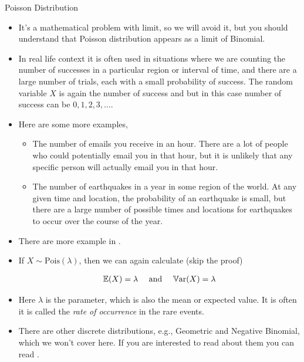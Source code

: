 \documentclass[8pt, usepdftitle=false]{beamer}
\begin{document}
\begin{frame}[allowframebreaks]{Poisson Distribution}
\begin{itemize}
\item It's a mathematical problem with limit, so we will avoid it, but you should understand that Poisson distribution appears as a limit of Binomial.

\framebreak

\item In real life context it  is often used in situations where we are counting the number of successes in a particular region or interval of time, and there are a large number of trials, each with a small probability of success. The random variable $X$ is again the number of success and but in this case number of success can be $0, 1, 2, 3, \ldots $.

\item Here are some more examples, 

\begin{itemize}
	\item The number of emails you receive in an hour. There are a lot of people who could potentially email you in that hour, but it is unlikely that any specific person will actually email you in that hour.

	\item The number of earthquakes in a year in some region of the world. At any given time and location, the probability of an earthquake is small, but there are a large number of possible times and locations for earthquakes to occur over the course of the year. 

\end{itemize}


\item There are more example in \cite{anderson_statistics_2020}.

\item If $X \sim \mathrm{Pois}(\lambda)$, then we can again calculate (skip the proof)

\begin{align*}
\mathbb{E}(X) = \lambda \quad \text{ and } \quad \mathbb{V}\mathrm{ar}{(}X) = \lambda
\end{align*}



\item Here $\lambda$ is the parameter, which is also the mean or expected value. It is often it is called the \emph{rate of occurrence} in the rare events.


\framebreak

\item There are other discrete distributions, e.g., Geometric and Negative Binomial, which we won't cover here. If you are interested to read about them you can read \cite{degroot_probability_2012}.

\end{itemize}


\end{frame}
\end{document}
